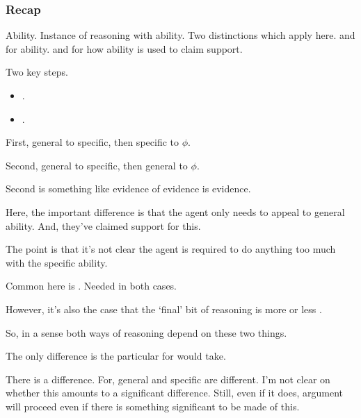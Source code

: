 \subsubsection{Recap}
\label{sec:recap-reasoning}

\begin{note}
  Ability.
  Instance of reasoning with ability.
  Two distinctions which apply here.
  \AR{} and \WR{} for ability.
  \ur{} and \nr{} for how ability is used to claim support.
\end{note}

\begin{note}
  Two key steps.
  \begin{itemize}
  \item \gsi{}.
  \item {}.
  \end{itemize}

  First, general to specific, then specific to \(\phi\).

  Second, general to specific, then general to \(\phi\).
\end{note}

\begin{note}
  Second is something like evidence of evidence is evidence.

  Here, the important difference is that the agent only needs to appeal to general ability.
  And, they've claimed support for this.

  The point is that it's not clear the agent is required to do anything too much with the specific ability.
\end{note}

\begin{note}[Focus]
  Common here is \gsi{}.
  Needed in both cases.

  However, it's also the case that the `final' bit of reasoning is more or less .

  So, in a sense both ways of reasoning depend on these two things.

  The only difference is the particular for  would take.

  There is a difference.
  For, general and specific are different.
  I'm not clear on whether this amounts to a significant difference.
  Still, even if it does, argument will proceed even if there is something significant to be made of this.
\end{note}

